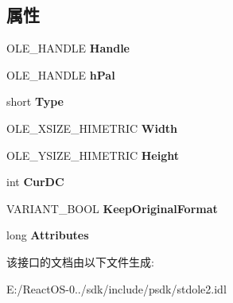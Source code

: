 \subsection*{属性}
\begin{DoxyCompactItemize}
\item 
\mbox{\label{interfacestdole_1_1_i_picture_a7f4dc1b2875e7cb329ce58f5939d41b4}} 
O\+L\+E\+\_\+\+H\+A\+N\+D\+LE {\bfseries Handle}
\item 
\mbox{\label{interfacestdole_1_1_i_picture_a3ea6c4c8b2aebef35f4dcd4b00a02731}} 
O\+L\+E\+\_\+\+H\+A\+N\+D\+LE {\bfseries h\+Pal}
\item 
\mbox{\label{interfacestdole_1_1_i_picture_a89f875feeecc89040c99d2efb5f73358}} 
short {\bfseries Type}
\item 
\mbox{\label{interfacestdole_1_1_i_picture_a9d78640431a55b748ae395234c9d819d}} 
O\+L\+E\+\_\+\+X\+S\+I\+Z\+E\+\_\+\+H\+I\+M\+E\+T\+R\+IC {\bfseries Width}
\item 
\mbox{\label{interfacestdole_1_1_i_picture_ac51cb08449151d63e6f70f7c31c263ed}} 
O\+L\+E\+\_\+\+Y\+S\+I\+Z\+E\+\_\+\+H\+I\+M\+E\+T\+R\+IC {\bfseries Height}
\item 
\mbox{\label{interfacestdole_1_1_i_picture_a16449fdbf6486ad728fbe4f03d7fe797}} 
int {\bfseries Cur\+DC}
\item 
\mbox{\label{interfacestdole_1_1_i_picture_a9c8c5b7aa710ce5efed4f975a81d17fb}} 
V\+A\+R\+I\+A\+N\+T\+\_\+\+B\+O\+OL {\bfseries Keep\+Original\+Format}
\item 
\mbox{\label{interfacestdole_1_1_i_picture_a585002da7b2d97507ee2ae9dcf71aed8}} 
long {\bfseries Attributes}
\end{DoxyCompactItemize}


该接口的文档由以下文件生成\+:\begin{DoxyCompactItemize}
\item 
E\+:/\+React\+O\+S-\/0../sdk/include/psdk/stdole2.\+idl\end{DoxyCompactItemize}
